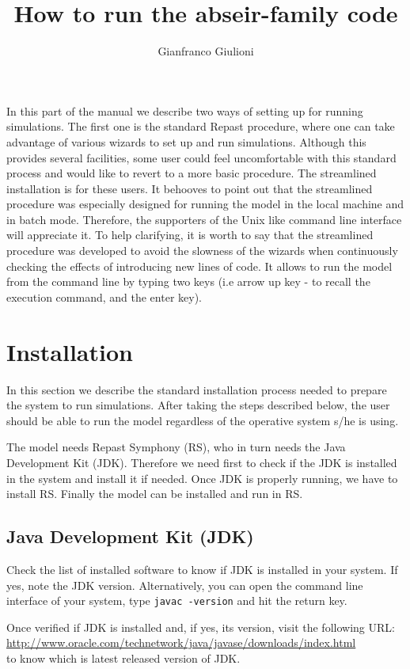 \documentclass{article}
\title{How to run the abseir-family code}
\author{Gianfranco Giulioni}
\begin{document}
\maketitle


In this part of the manual we describe two ways of setting up for running simulations. The first one is the standard Repast procedure, where one can take advantage of various wizards to set up and run simulations. Although this provides several facilities, some user could feel uncomfortable with this standard process and would like to revert to a more basic procedure. The streamlined installation is for these users. It behooves to point out that the streamlined procedure was especially designed for running the model in the local machine and in batch mode. Therefore, the supporters of the Unix like command line interface will appreciate it. To help clarifying, it is worth to say that the streamlined procedure was developed to avoid the slowness of the wizards when continuously checking the effects of introducing new lines of code. It allows to run the model from the command line by typing two keys (i.e arrow up key - to recall the execution command, and the enter key). 


\section{Installation}

In this section we describe the standard installation process needed to prepare the system to run simulations. After taking the steps described below, the user should be able to run the model regardless of the operative system s/he is using.

The model needs Repast Symphony (RS), who in turn needs the Java Development Kit (JDK). Therefore we need first to check if the JDK is installed in the system and install it if needed. Once JDK is properly running, we have to install RS. Finally the model can be installed and run in RS.

\subsection{Java Development Kit (JDK)}

Check the list of installed software to know if JDK is installed in your system. If yes, note the JDK version.
Alternatively, you can open the command line interface of your system, type \verb+javac -version+ and hit the return key. 

Once verified if JDK is installed and, if yes, its version, visit the following URL:\\
\url{http://www.oracle.com/technetwork/java/javase/downloads/index.html}\\
to know which is latest released version of JDK.
\end{document}
